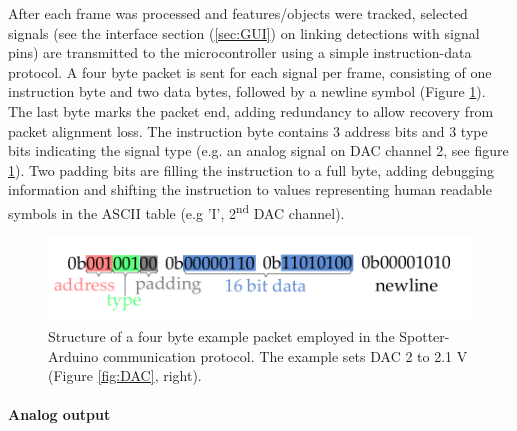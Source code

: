 After each frame was processed and features/objects were tracked, selected signals (see the interface section (\ref{sec:GUI}) on linking detections with signal pins) are transmitted to the microcontroller using a simple instruction-data protocol. A four byte packet is sent for each signal per frame, consisting of one instruction byte and two data bytes, followed by a newline symbol (Figure \ref{fig:protocol}). The last byte marks the packet end, adding redundancy to allow recovery from packet alignment loss. The instruction byte contains 3 address bits and 3 type bits indicating the signal type (e.g. an analog signal on DAC channel 2, see figure \ref{fig:protocol}). Two padding bits are filling the instruction to a full byte, adding debugging information and shifting the instruction to values representing human readable symbols in the ASCII table (e.g 'I', 2\textsuperscript{nd} DAC channel).


\begin{figure}%
	\centering
		\includegraphics [width=\linewidth]{gfx/protocol.pdf} %
	\caption[Test]{Structure of a four byte example packet employed in the Spotter-Arduino communication protocol. The example sets DAC 2 to 2.1 V (Figure \ref{fig:DAC}, right).}
	\label{fig:protocol}
\end{figure}



\paragraph{Analog output}
\label{sec:AnalogOutput}

